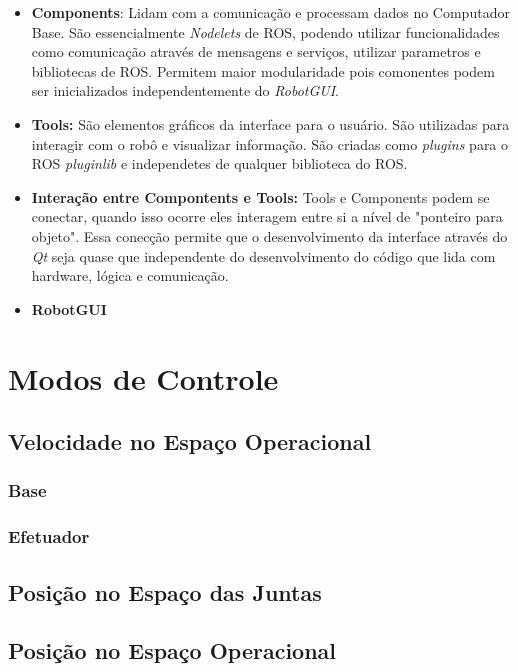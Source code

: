 \begin{itemize}
\item \textbf{Components}: Lidam com a comunicação e processam dados no Computador Base. São essencialmente \textit{Nodelets} de ROS, podendo utilizar funcionalidades como comunicação através de mensagens e serviços, utilizar parametros e bibliotecas de ROS. Permitem maior modularidade pois comonentes podem ser inicializados independentemente do \textit{RobotGUI}.

\item \textbf{Tools:} São elementos gráficos da interface para o usuário. São utilizadas para interagir com o robô e visualizar informação. São criadas como \textit{plugins} para o ROS \textit{pluginlib} e independetes de qualquer biblioteca do ROS.

\item \textbf{Interação entre Compontents e Tools:} Tools e Components podem se conectar, quando isso ocorre eles interagem entre si a nível de "ponteiro para objeto". Essa conecção permite que o desenvolvimento da interface através do \textit{Qt} seja quase que independente do desenvolvimento do código que lida com hardware, lógica e comunicação.

\item \textbf{RobotGUI}
\end{itemize}


\section{Modos de Controle}

\subsection{Velocidade no Espaço Operacional}
\subsubsection{Base}
\subsubsection{Efetuador}
\subsection{Posição no Espaço das Juntas}
\subsection{Posição no Espaço Operacional}

